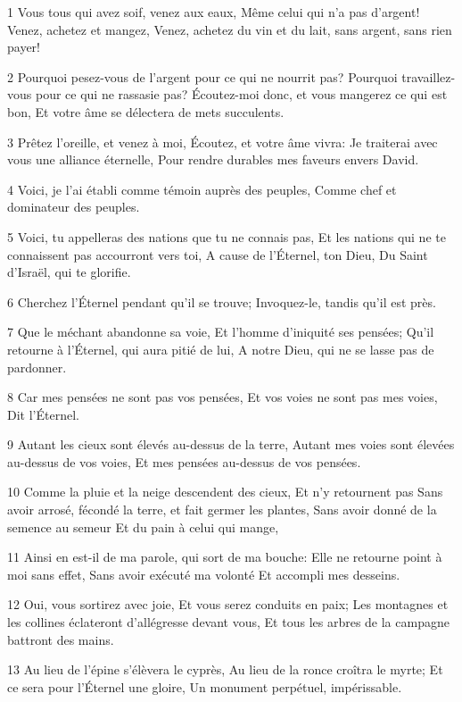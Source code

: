 \par 1 Vous tous qui avez soif, venez aux eaux, Même celui qui n'a pas d'argent! Venez, achetez et mangez, Venez, achetez du vin et du lait, sans argent, sans rien payer!
\par 2 Pourquoi pesez-vous de l'argent pour ce qui ne nourrit pas? Pourquoi travaillez-vous pour ce qui ne rassasie pas? Écoutez-moi donc, et vous mangerez ce qui est bon, Et votre âme se délectera de mets succulents.
\par 3 Prêtez l'oreille, et venez à moi, Écoutez, et votre âme vivra: Je traiterai avec vous une alliance éternelle, Pour rendre durables mes faveurs envers David.
\par 4 Voici, je l'ai établi comme témoin auprès des peuples, Comme chef et dominateur des peuples.
\par 5 Voici, tu appelleras des nations que tu ne connais pas, Et les nations qui ne te connaissent pas accourront vers toi, A cause de l'Éternel, ton Dieu, Du Saint d'Israël, qui te glorifie.
\par 6 Cherchez l'Éternel pendant qu'il se trouve; Invoquez-le, tandis qu'il est près.
\par 7 Que le méchant abandonne sa voie, Et l'homme d'iniquité ses pensées; Qu'il retourne à l'Éternel, qui aura pitié de lui, A notre Dieu, qui ne se lasse pas de pardonner.
\par 8 Car mes pensées ne sont pas vos pensées, Et vos voies ne sont pas mes voies, Dit l'Éternel.
\par 9 Autant les cieux sont élevés au-dessus de la terre, Autant mes voies sont élevées au-dessus de vos voies, Et mes pensées au-dessus de vos pensées.
\par 10 Comme la pluie et la neige descendent des cieux, Et n'y retournent pas Sans avoir arrosé, fécondé la terre, et fait germer les plantes, Sans avoir donné de la semence au semeur Et du pain à celui qui mange,
\par 11 Ainsi en est-il de ma parole, qui sort de ma bouche: Elle ne retourne point à moi sans effet, Sans avoir exécuté ma volonté Et accompli mes desseins.
\par 12 Oui, vous sortirez avec joie, Et vous serez conduits en paix; Les montagnes et les collines éclateront d'allégresse devant vous, Et tous les arbres de la campagne battront des mains.
\par 13 Au lieu de l'épine s'élèvera le cyprès, Au lieu de la ronce croîtra le myrte; Et ce sera pour l'Éternel une gloire, Un monument perpétuel, impérissable.


